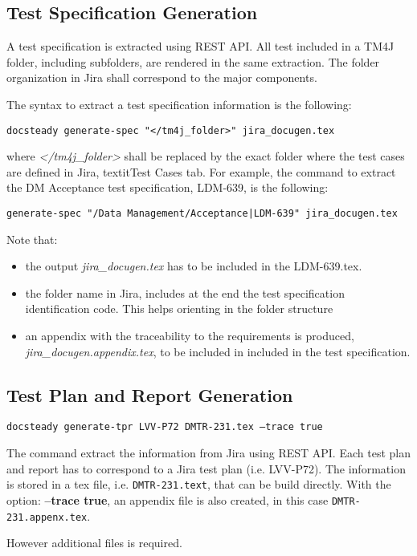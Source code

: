 \documentclass[DM]{lsstdoc}
\begin{document}
\subsection{Test Specification Generation}

A test specification is extracted using REST API.
All test included in a TM4J folder, including subfolders, are rendered in the same extraction.
The folder organization in Jira shall correspond to the major components.

The syntax to extract a test specification information is the following:

\texttt{docsteady generate-spec "</tm4j\_folder>" jira\_docugen.tex}

where \textit{</tm4j\_folder>} shall be replaced by the exact folder where the test cases are defined in Jira, textit{Test Cases} tab.
For example, the command to extract the DM Acceptance test specification, LDM-639, is the following:

\texttt{generate-spec "/Data Management/Acceptance|LDM-639" jira\_docugen.tex}

Note that:
\begin{itemize}
\item the output \textit{jira\_docugen.tex} has to be included in the LDM-639.tex.
\item the folder name in Jira, includes at the end the test specification identification code. This helps orienting in the folder structure
\item an appendix with the traceability to the requirements is produced, \textit{jira\_docugen.appendix.tex}, to be included in included in the test specification.
\end{itemize}



\subsection{Test Plan and Report Generation}

\texttt{docsteady generate-tpr LVV-P72 DMTR-231.tex --trace true}

The command extract the information from Jira using REST API.
Each test plan and report has to correspond to a Jira test plan (i.e. LVV-P72).
The information is stored in a tex file, i.e. \texttt{DMTR-231.text}, that can be build directly.
With the option: \textbf{--trace true}, an appendix file is also created, in this case \texttt{DMTR-231.appenx.tex}.

However additional files is required.
\end{document}
